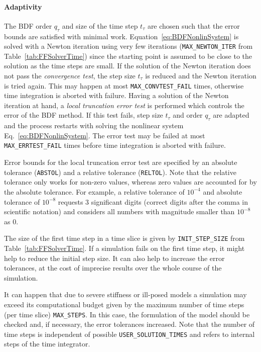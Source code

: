 \paragraph{Adaptivity}
\label{par:SimTimeIntegrationAdaptivity}

The BDF order $q_{\tau}$ and size of the time step $t_\tau$ are chosen such that the error bounds are satisfied with minimal work.
Equation~\eqref{eq:BDFNonlinSystem} is solved with a Newton iteration using very few iterations (\texttt{MAX\_NEWTON\_ITER} from Table~\ref{tab:FFSolverTime}) since the starting point is assumed to be close to the solution as the time steps are small.
If the solution of the Newton iteration does not pass the \textit{convergence test}, the step size $t_\tau$ is reduced and the Newton iteration is tried again.
This may happen at most \texttt{MAX\_CONVTEST\_FAIL} times, otherwise time integration is aborted with failure.
Having a solution of the Newton iteration at hand, a \textit{local truncation error test} is performed which controls the error of the BDF method.
If this test fails, step size $t_\tau$ and order $q_{\tau}$ are adapted and the process restarts with solving the nonlinear system Eq.~\eqref{eq:BDFNonlinSystem}.
The error test may be failed at most \texttt{MAX\_ERRTEST\_FAIL} times before time integration is aborted with failure.

Error bounds for the local truncation error test are specified by an absolute tolerance (\texttt{ABSTOL}) and a relative tolerance (\texttt{RELTOL}).
Note that the relative tolerance only works for non-zero values, whereas zero values are accounted for by the absolute tolerance.
For example, a relative tolerance of $10^{-4}$ and absolute tolerance of $10^{-8}$ requests $3$ significant digits (correct digits after the comma in scientific notation) and considers all numbers with magnitude smaller than $10^{-8}$ as $0$.

The size of the first time step in a time slice is given by \texttt{INIT\_STEP\_SIZE} from Table~\ref{tab:FFSolverTime}.
If a simulation fails on the first time step, it might help to reduce the initial step size.
It can also help to increase the error tolerances, at the cost of imprecise results over the whole course of the simulation.

It can happen that due to severe stiffness or ill-posed models a simulation may exceed its computational budget given by the maximum number of time steps (per time slice) \texttt{MAX\_STEPS}.
In this case, the formulation of the model should be checked and, if necessary, the error tolerances increased.
Note that the number of time steps is independent of possible \texttt{USER\_SOLUTION\_TIMES} and refers to internal steps of the time integrator.

